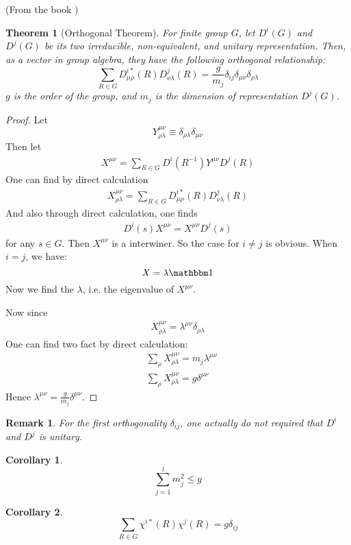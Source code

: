 \documentclass{article}
\numberwithin{equation}{subsection} %
\newtheorem{thm}{Theorem}[section]
\newtheorem{remark}{Remark}[section]
\newtheorem{coro}{Corollary}[section]
\theoremstyle{definition}
\begin{document}
(From the book \cite{book})
\begin{thm}[Orthogonal Theorem]
    For finite group $G$, let $D^i(G)$ and $D^j(G)$ be its two
    irreducible, non-equivalent, and unitary representation. Then, as
    a vector in group algebra, they have the following orthogonal
    relationship:
    \begin{equation}
        \sum_{R\in G} D^{i*}_{\mu\rho}(R)D^j_{\nu \lambda}(R) =
        \frac{g}{m_j} \delta_{ij} \delta_{\mu\nu}\delta_{\rho\lambda}
    \end{equation}
    $g$ is the order of the group, and $m_j$ is the
    dimension of representation $D^j(G)$.
\end{thm}
\begin{proof}
    Let
    \begin{equation}
        Y_{\rho\lambda}^{\mu\nu} \equiv
        \delta_{\rho\lambda}\delta_{\mu\nu}
    \end{equation}
    Then let
    \begin{align*}
        X^{\mu\nu} = \sum_{R\in G} D^i(R^{-1}) Y^{\mu\nu} D^j(R)
    \end{align*}
    One can find by direct calculation
    \begin{align}
        X^{\mu\nu}_{\rho\lambda}= \sum_{R\in G}
        D^{i*}_{\mu\rho}(R)D^j_{\nu \lambda}(R)
    \end{align}
    And also through direct calculation, one finds
    \begin{align*}
        D^i (s) X^{\mu\nu} = X^{\mu\nu} D^j(s)
    \end{align*}
    for any $s\in G$. 
    Then $X^{\mu\nu}$ is a interwiner. So the case for $i\neq j$ is
    obvious. When $i=j$, we have:
    $$ X = \lambda \id$$
    Now we find the $\lambda$, i.e. the eigenvalue of $X^{\mu\nu}$.
    
    Now since
    \begin{align*}
        X^{\mu\nu}_{\rho\lambda} = \lambda^{\mu\nu}
        \delta_{\rho\lambda}
    \end{align*}
    One can find two fact by direct calculation:
    \begin{align*}
        &\sum_\rho X^{\mu\nu}_{\rho\lambda} = m_j \lambda^{\mu\nu} \\
        &\sum_\rho X^{\mu\nu}_{\rho\lambda} = g \delta^{\mu\nu}
    \end{align*}
    Hence $\lambda^{\mu\nu} = \frac{g}{m_j} \delta^{\mu\nu}$.
\end{proof}
\begin{remark}
    For the first orthogonality $\delta_{ij}$, one actually do not
    required that $D^i$ and $D^j$ is unitary.
\end{remark}
\begin{coro}
    \begin{equation}
        \sum_{j=1}^{l} m_j^2 \leq g
    \end{equation}
\end{coro}
\begin{coro}
    \begin{equation}
        \sum_{R\in G} \chi^{i*}(R)\chi^j(R) = g \delta_{ij}
    \end{equation}
\end{coro}
\end{document}
